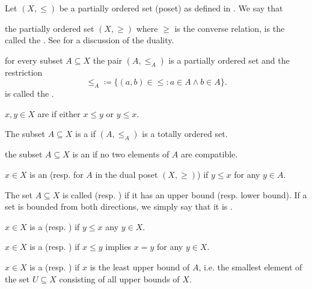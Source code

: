 \begin{definition}\label{def:poset}
  Let \( (X, \leq) \) be a partially ordered set (poset) as defined in . We say that

  \begin{defenum}
     the partially ordered set \( (X, \geq) \) where \( \geq \) is the converse relation, is the called the . See  for a discussion of the duality.

     for every subset \( A \subseteq X \) the pair \( (A, \leq_A) \) is a partially ordered set and the restriction
    \begin{equation*}
      \leq_A \coloneqq \{ (a, b) \in \leq \colon a \in A \land b \in A \}.
    \end{equation*}
    is called the .

     \( x, y \in X \) are  if either \( x \leq y \) or \( y \leq x \).

     The subset \( A \subseteq X \) is a  if \( (A, \leq_A) \) is a totally ordered set.

     the subset \( A \subseteq X \) is an  if no two elements of \( A \) are compatible.

    \cite[170]{Enderton1977} \( x \in X \) is an  (resp.  for \( A \) in the dual poset \( (X, \geq) \)) if \( y \leq x \) for any \( y \in A \).

     The set \( A \subseteq X \) is called  (resp. ) if it has an upper bound (resp. lower bound). If a set is bounded from both directions, we simply say that it is .

    \cite[171]{Enderton1977} \( x \in X \) is a  (resp. ) if \( y \leq x \) any \( y \in X \).

    \cite[170]{Enderton1977} \( x \in X \) is a  (resp. ) if \( x \leq y \) implies \( x = y \) for any \( y \in X \).

    \cite[170]{Enderton1977} \( x \in X \) is a  (resp. ) if \( x \) is the least upper bound of \( A \), i.e. the smallest element of the set \( U \subseteq X \) consisting of all upper bounds of \( X \).
  \end{defenum}
\end{definition}

